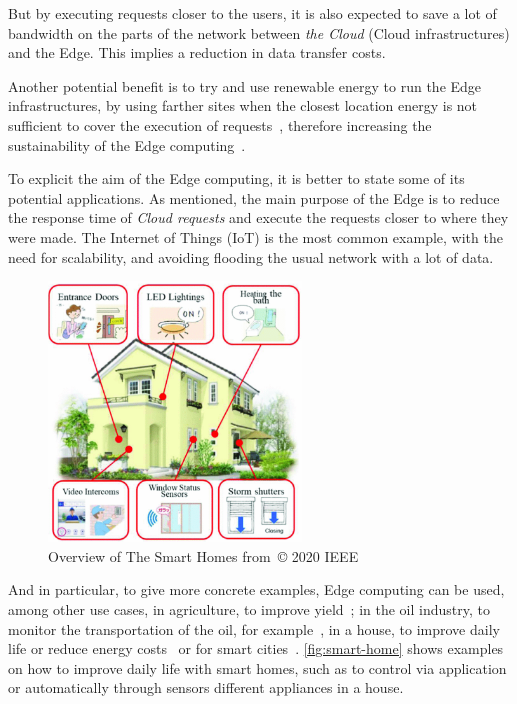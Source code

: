 %
But by executing requests closer to the users, it is also expected to
save a lot of bandwidth on the parts of the network between \emph{the
  Cloud} (Cloud infrastructures) and the Edge.
%
This implies a reduction in data transfer costs.


%
Another potential benefit is to try and use renewable energy to run
the Edge infrastructures, by using farther sites when the closest
location energy is not sufficient to cover the execution of
requests~\cite{LYDP+18}, therefore increasing the sustainability of
the Edge computing~\cite{VLDH+21}.


To explicit the aim of the Edge computing, it is better to state some
of its potential applications.
%
As mentioned, the main purpose of the Edge is to reduce the response
time of \emph{Cloud requests} and execute the requests closer to where
they were made.
%
The Internet of Things (\acrshort{IoT}) is the most common example, with
the need for scalability, and avoiding flooding the usual network with
a lot of data.

\begin{figure}
  \centering
  \includegraphics[width=0.6\textwidth]{figs/png/smart-homes}
  \caption{Overview of The Smart Homes from~\cite{II20}© 2020 IEEE}
  \label{fig:smart-home}
\end{figure}

And in particular, to give more concrete examples, Edge computing can
be used, among other use cases, in agriculture, \eg to improve
yield~\cite{SKPJ+19, DC19, JGE17}; in the oil industry, \eg to monitor
the transportation of the oil, for example~\cite{ALSL21, AONOA21}, in
a house, \eg to improve daily life or reduce energy costs~\cite{VBT16,
SH20, II20} or for smart cities~\cite{SKH18, YXCW+15}.
%
\autoref{fig:smart-home} shows examples on how to improve daily life
with smart homes, such as to control via application or automatically
through sensors different appliances in a house.





